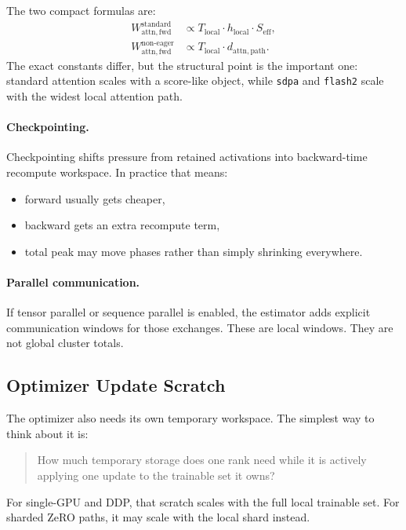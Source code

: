 The two compact formulas are:
\begin{align*}
W_{\mathrm{attn,fwd}}^{\mathrm{standard}}
&\propto
T_{\mathrm{local}} \cdot h_{\mathrm{local}} \cdot S_{\mathrm{eff}}, \\
W_{\mathrm{attn,fwd}}^{\mathrm{non\text{-}eager}}
&\propto
T_{\mathrm{local}} \cdot d_{\mathrm{attn,path}}.
\end{align*}
The exact constants differ, but the structural point is the important one:
standard attention scales with a score-like object, while \texttt{sdpa} and
\texttt{flash2} scale with the widest local attention path.

\paragraph{Checkpointing.}
Checkpointing shifts pressure from retained activations into backward-time
recompute workspace. In practice that means:
\begin{itemize}[leftmargin=1.5em]
\item forward usually gets cheaper,
\item backward gets an extra recompute term,
\item total peak may move phases rather than simply shrinking everywhere.
\end{itemize}

\paragraph{Parallel communication.}
If tensor parallel or sequence parallel is enabled, the estimator adds explicit
communication windows for those exchanges. These are local windows. They are
not global cluster totals.

\subsection{Optimizer Update Scratch}
The optimizer also needs its own temporary workspace. The simplest way to think
about it is:

\begin{quote}
How much temporary storage does one rank need while it is actively applying one
update to the trainable set it owns?
\end{quote}

For single-GPU and DDP, that scratch scales with the full local trainable set.
For sharded ZeRO paths, it may scale with the local shard instead.

